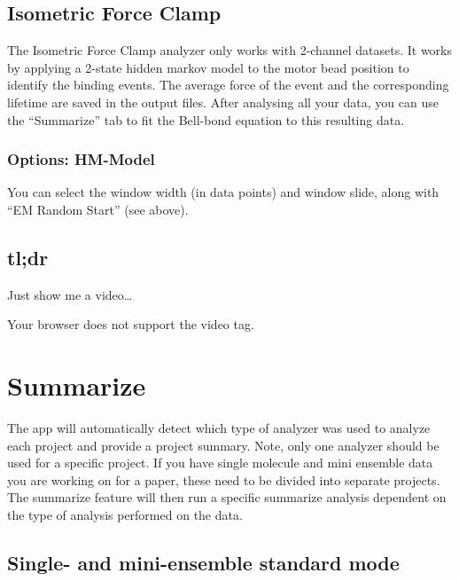\documentclass[
]{book}
\begin{document}
\section{Isometric Force Clamp}\label{isometric-force-clamp}

The Isometric Force Clamp analyzer only works with 2-channel datasets. It works by applying a 2-state hidden markov model to the motor bead position to identify the binding events. The average force of the event and the corresponding lifetime are saved in the output files. After analysing all your data, you can use the ``Summarize'' tab to fit the Bell-bond equation to this resulting data.

\subsection{Options: HM-Model}\label{options-hm-model-1}

You can select the window width (in data points) and window slide, along with ``EM Random Start'' (see above).

\section{tl;dr}\label{tldr-1}

Just show me a video\ldots{}

Your browser does not support the video tag.

\chapter{Summarize}\label{summarize}

The app will automatically detect which type of analyzer was used to analyze each project and provide a project summary. Note, only one analyzer should be used for a specific project. If you have single molecule and mini ensemble data you are working on for a paper, these need to be divided into separate projects. The summarize feature will then run a specific summarize analysis dependent on the type of analysis performed on the data.

\section{Single- and mini-ensemble standard mode}\label{single--and-mini-ensemble-standard-mode}
\end{document}
